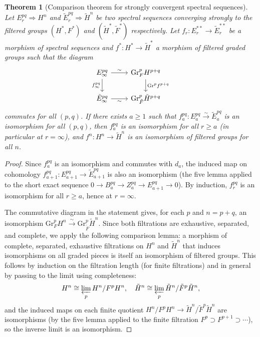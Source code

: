 \documentclass[12pt,a4paper]{article}
\newtheorem{theorem}{Theorem}[section]
\theoremstyle{definition}
\newcommand{\Gr}{\mathrm{Gr}}
\begin{document}
\begin{theorem}[Comparison theorem for strongly convergent spectral sequences]
\label{thm:5-term}
Let $E_r^{pq}\Rightarrow H^n$ and $\tilde{E}_r^{pq}\Rightarrow\tilde{H}^n$ be two
spectral sequences converging strongly to the filtered groups $(H^*,F^*)$ and
$(\tilde{H}^*,\tilde{F}^*)$ respectively.  Let
$f_r:E_r^{**}\to\tilde{E}_r^{**}$ be a morphism of spectral sequences and
$f^*:H^*\to\tilde{H}^*$ a morphism of filtered graded groups such that the diagram
\[
\begin{tikzcd}
  E_\infty^{pq} \ar[r,"\sim"] \ar[d,"f_\infty^{pq}"'] &
    \Gr_F^p H^{p+q} \ar[d,"\Gr^p f^{p+q}"] \\
  \tilde{E}_\infty^{pq} \ar[r,"\sim"'] &
    \Gr_{\tilde{F}}^p \tilde{H}^{p+q}
\end{tikzcd}
\]
commutes for all $(p,q)$.  If there exists $a\geq 1$ such that
$f_a^{pq}:E_a^{pq}\xrightarrow{\sim}\tilde{E}_a^{pq}$ is an isomorphism for all
$(p,q)$, then $f_a^{pq}$ is an isomorphism for all $r\geq a$ (in particular at
$r=\infty$), and $f^n:H^n\to\tilde{H}^n$ is an isomorphism of filtered groups for
all $n$.
\end{theorem}
\begin{proof}
Since $f_a^{pq}$ is an isomorphism and commutes with $d_a$, the induced map on
cohomology $f_{a+1}^{pq}:E_{a+1}^{pq}\to\tilde{E}_{a+1}^{pq}$ is also an
isomorphism (the five lemma applied to the short exact sequence
$0\to B_a^{pq}\to Z_a^{pq}\to E_{a+1}^{pq}\to 0$).  By induction, $f_r^{pq}$ is
an isomorphism for all $r\geq a$, hence at $r=\infty$.

The commutative diagram in the statement gives, for each $p$ and $n=p+q$, an
isomorphism $\Gr_F^p H^n\xrightarrow{\sim}\Gr_{\tilde{F}}^p\tilde{H}^n$.  Since
both filtrations are exhaustive, separated, and complete, we apply the following
comparison lemma: a morphism of complete, separated, exhaustive filtrations on $H^n$
and $\tilde{H}^n$ that induces isomorphisms on all graded pieces is itself an
isomorphism of filtered groups.  This follows by induction on the filtration length
(for finite filtrations) and in general by passing to the limit using completeness:
\[
  H^n \cong \varprojlim_p H^n/F^pH^n,\quad
  \tilde{H}^n \cong \varprojlim_p \tilde{H}^n/\tilde{F}^p\tilde{H}^n,
\]
and the induced maps on each finite quotient $H^n/F^pH^n\to
\tilde{H}^n/\tilde{F}^p\tilde{H}^n$ are isomorphisms (by the five lemma applied
to the finite filtration $F^p\supset F^{p+1}\supset\cdots$), so the inverse limit
is an isomorphism.
\end{proof}
\end{document}
